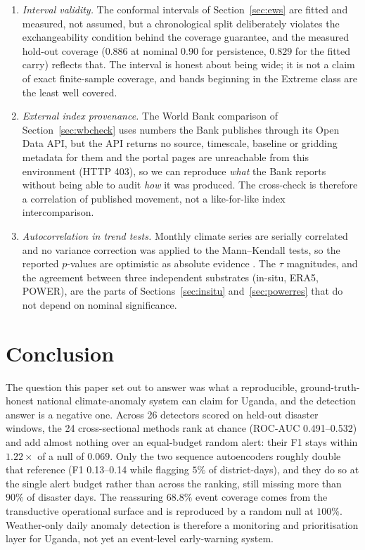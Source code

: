 \documentclass[preprint,12pt]{elsarticle}
\begin{document}
\begin{enumerate}
\item \emph{Interval validity.} The conformal intervals of Section~\ref{sec:ews}
are fitted and measured, not assumed, but a chronological split deliberately
violates the exchangeability condition behind the coverage guarantee, and the
measured hold-out coverage ($0.886$ at nominal $0.90$ for persistence, $0.829$
for the fitted carry) reflects that. The interval is honest about being wide; it
is not a claim of exact finite-sample coverage, and bands beginning in the
Extreme class are the least well covered.

\item \emph{External index provenance.} The World Bank comparison of
Section~\ref{sec:wbcheck} uses numbers the Bank publishes through its Open Data
API, but the API returns no source, timescale, baseline or gridding metadata for
them and the portal pages are unreachable from this environment (HTTP 403), so we
can reproduce \emph{what} the Bank reports without being able to audit \emph{how}
it was produced. The cross-check is therefore a correlation of published movement,
not a like-for-like index intercomparison.

\item \emph{Autocorrelation in trend tests.} Monthly climate series are serially
correlated and no variance correction was applied to the Mann--Kendall tests, so the
reported $p$-values are optimistic as absolute evidence \cite{hamed1998,yue2004}.
The $\tau$ magnitudes, and the agreement between three independent substrates
(in-situ, ERA5, POWER), are the parts of Sections~\ref{sec:insitu}
and~\ref{sec:powerres} that do not depend on nominal significance.
\end{enumerate}

\section{Conclusion}
The question this paper set out to answer was what a reproducible,
ground-truth-honest national climate-anomaly system can claim for Uganda, and the
detection answer is a negative one. Across 26 detectors scored on held-out
disaster windows, the 24 cross-sectional methods rank at chance (ROC-AUC
0.491--0.532) and add almost nothing over an equal-budget random alert: their F1
stays within $1.22\times$ of a null of $0.069$. Only the two sequence
autoencoders roughly double that reference (F1 0.13--0.14 while flagging $5\%$ of
district-days), and they do so at the single alert budget rather than across the
ranking, still missing more than $90\%$ of disaster days. The reassuring
$68.8\%$ event coverage comes from the transductive operational surface and is
reproduced by a random null at $100\%$. Weather-only daily anomaly detection is
therefore a monitoring and prioritisation layer for Uganda, not yet an
event-level early-warning system.
\end{document}
